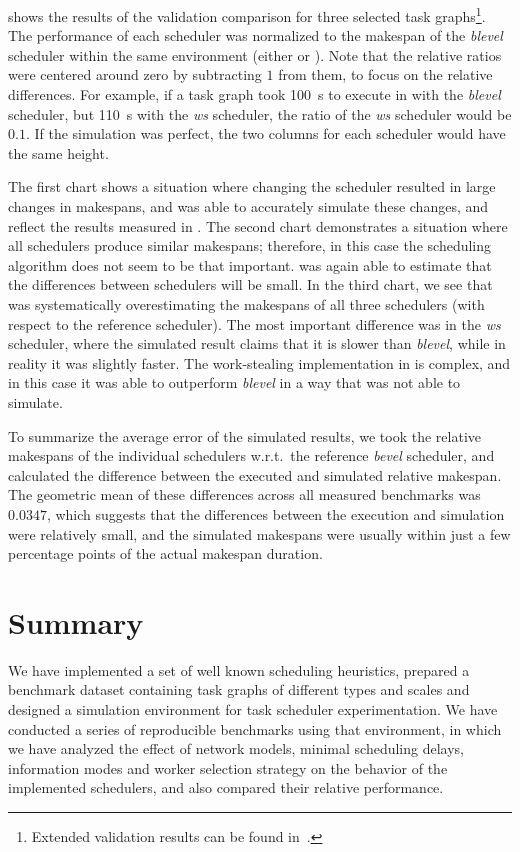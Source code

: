  shows the results of the validation comparison for three selected
task graphs\footnote{Extended validation results can be found in~\cite{estee}.}. The performance of each scheduler was normalized to the
makespan of the \emph{blevel} scheduler within the same environment (either
\estee{} or \dask{}). Note that the relative ratios were centered
around zero by subtracting $1$ from them, to focus on the relative differences.
For example, if a task graph took \SI{100}{\second} to execute in \dask{}
with the \emph{blevel} scheduler, but \SI{110}{\second} with the
\emph{ws} scheduler, the ratio of the \emph{ws} scheduler would be
$0.1$. If the simulation was perfect, the two columns for each scheduler would
have the same height.

The first chart shows a situation where changing the scheduler resulted in large changes in
makespans, and \estee{} was able to accurately simulate these changes, and reflect
the results measured in \dask{}. The second chart demonstrates a situation where
all schedulers produce similar makespans; therefore, in this case the scheduling algorithm does not
seem to be that important. \estee{} was again able to estimate that the differences
between schedulers will be small. In the third chart, we see that \estee{} was
systematically overestimating the makespans of all three schedulers (with respect to the reference
scheduler). The most important difference was in the \emph{ws} scheduler, where the
simulated result claims that it is slower than \emph{blevel}, while in reality it was
slightly faster. The work-stealing implementation in \dask{} is complex, and in
this case it was able to outperform \emph{blevel} in a way that \estee{}
was not able to simulate.

To summarize the average error of the simulated results, we took the relative makespans of the
individual schedulers w.r.t.\ the reference \emph{bevel} scheduler, and calculated the
difference between the executed and simulated relative makespan. The geometric mean of these
differences across all measured benchmarks was $0.0347$, which suggests that the
differences between the execution and simulation were relatively small, and the simulated makespans
were usually within just a few percentage points of the actual makespan duration.

\section*{Summary}
We have implemented a set of well known scheduling heuristics, prepared a benchmark dataset
containing task graphs of different types and scales and designed a simulation environment for task
scheduler experimentation. We have conducted a series of reproducible benchmarks using that
environment, in which we have analyzed the effect of network models, minimal scheduling delays,
information modes and worker selection strategy on the behavior of the implemented schedulers, and
also compared their relative performance.

